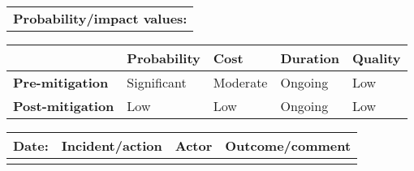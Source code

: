 \begin{table}
\begin{tabularx}{\textwidth}{| X |}
		\hline
		\textbf{Probability/impact values:} \\
	\end{tabularx}
	\begin{tabularx}{\textwidth}{| l | l | X | X | X |}
		\hline
		 &  \textbf{Probability} & \textbf{Cost} & \textbf{Duration} & \textbf{Quality} \\ \hline
		\textbf{Pre-mitigation} & Significant & Moderate & Ongoing & Low \\ \hline
		\textbf{Post-mitigation} & Low & Low & Ongoing & Low \\ \hline \hline
	\end{tabularx}
	\begin{tabularx}{\textwidth}{| l | X | l | X |}
		\hline
		\textbf{Date:} & \textbf{Incident/action} & \textbf{Actor} & \textbf{Outcome/comment} \\ \hline
		 &  &  &  \\ \hline
	\end{tabularx}%
\end{table}

